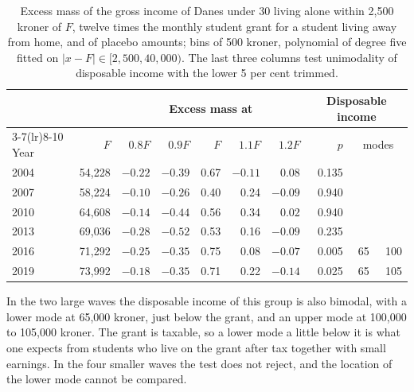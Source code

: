 \begin{table}[t]
\centering\small
\caption{Excess mass of the gross income of Danes under 30 living alone within 2{,}500 kroner of $F$, twelve times the monthly student grant for a student living away from home, and of placebo amounts; bins of 500 kroner, polynomial of degree five fitted on $|x-F|\in[2{,}500,40{,}000)$. The last three columns test unimodality of disposable income with the lower 5 per cent trimmed.}\label{tab:su}
\begin{tabular}{lrrrrrrrrr}
\toprule
 & & \multicolumn{5}{c}{Excess mass at} & \multicolumn{3}{c}{Disposable income}\\
\cmidrule(lr){3-7}\cmidrule(lr){8-10}
Year & $F$ & $0.8F$ & $0.9F$ & $F$ & $1.1F$ & $1.2F$ & $p$ & \multicolumn{2}{c}{modes}\\
\midrule
2004 & 54{,}228 & $-0.22$ & $-0.39$ & 0.67 & $-0.11$ & 0.08 & 0.135 & & \\
2007 & 58{,}224 & $-0.10$ & $-0.26$ & 0.40 & 0.24 & $-0.09$ & 0.940 & & \\
2010 & 64{,}608 & $-0.14$ & $-0.44$ & 0.56 & 0.34 & 0.02 & 0.940 & & \\
2013 & 69{,}036 & $-0.28$ & $-0.52$ & 0.53 & 0.16 & $-0.09$ & 0.235 & & \\
2016 & 71{,}292 & $-0.25$ & $-0.35$ & 0.75 & 0.08 & $-0.07$ & 0.005 & 65 & 100\\
2019 & 73{,}992 & $-0.18$ & $-0.35$ & 0.71 & 0.22 & $-0.14$ & 0.025 & 65 & 105\\
\bottomrule
\end{tabular}
\end{table}

In the two large waves the disposable income of this group is also bimodal, with a lower mode at 65{,}000 kroner, just below the grant, and an upper mode at 100{,}000 to 105{,}000 kroner. The grant is taxable, so a lower mode a little below it is what one expects from students who live on the grant after tax together with small earnings. In the four smaller waves the test does not reject, and the location of the lower mode cannot be compared.
